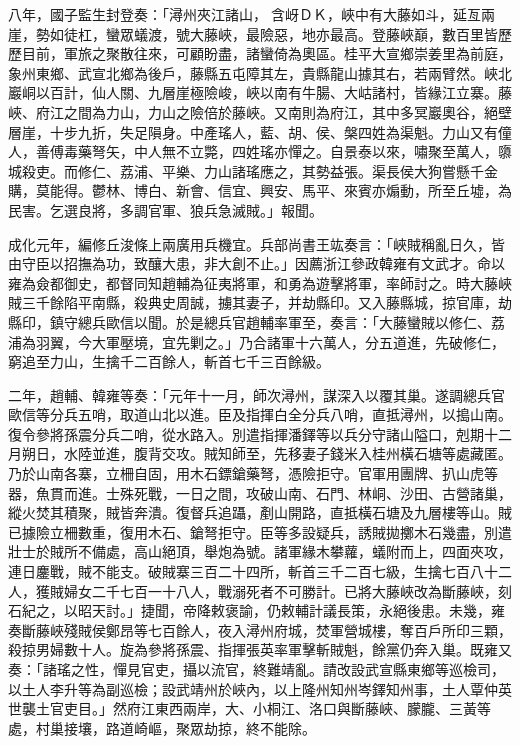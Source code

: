 \begin{pinyinscope}
八年，國子監生封登奏：「潯州夾江諸山，含岈ＤＫ，峽中有大藤如斗，延亙兩崖，勢如徒杠，蠻眾蟻渡，號大藤峽，最險惡，地亦最高。登藤峽巔，數百里皆歷歷目前，軍旅之聚散往來，可顧盼盡，諸蠻倚為奧區。桂平大宣鄉崇姜里為前庭，象州東鄉、武宣北鄉為後戶，藤縣五屯障其左，貴縣龍山據其右，若兩臂然。峽北巖峒以百計，仙人關、九層崖極險峻，峽以南有牛腸、大岵諸村，皆緣江立寨。藤峽、府江之間為力山，力山之險倍於藤峽。又南則為府江，其中多冥巖奧谷，絕壁層崖，十步九折，失足隕身。中產瑤人，藍、胡、侯、槃四姓為渠魁。力山又有僮人，善傅毒藥弩矢，中人無不立斃，四姓瑤亦憚之。自景泰以來，嘯聚至萬人，隳城殺吏。而修仁、荔浦、平樂、力山諸瑤應之，其勢益張。渠長侯大狗嘗懸千金購，莫能得。鬱林、博白、新會、信宜、興安、馬平、來賓亦煽動，所至丘墟，為民害。乞選良將，多調官軍、狼兵急滅賊。」報聞。

成化元年，編修丘浚條上兩廣用兵機宜。兵部尚書王竑奏言：「峽賊稱亂日久，皆由守臣以招撫為功，致釀大患，非大創不止。」因薦浙江參政韓雍有文武才。命以雍為僉都御史，都督同知趙輔為征夷將軍，和勇為遊擊將軍，率師討之。時大藤峽賊三千餘陷平南縣，殺典史周誠，擄其妻子，并劫縣印。又入藤縣城，掠官庫，劫縣印，鎮守總兵歐信以聞。於是總兵官趙輔率軍至，奏言：「大藤蠻賊以修仁、荔浦為羽翼，今大軍壓境，宜先剿之。」乃合諸軍十六萬人，分五道進，先破修仁，窮追至力山，生擒千二百餘人，斬首七千三百餘級。

二年，趙輔、韓雍等奏：「元年十一月，師次潯州，謀深入以覆其巢。遂調總兵官歐信等分兵五哨，取道山北以進。臣及指揮白全分兵八哨，直抵潯州，以搗山南。復令參將孫震分兵二哨，從水路入。別遣指揮潘鐸等以兵分守諸山隘口，剋期十二月朔日，水陸並進，腹背交攻。賊知師至，先移妻子錢米入桂州橫石塘等處藏匿。乃於山南各寨，立柵自固，用木石鏢鎗藥弩，憑險拒守。官軍用團牌、扒山虎等器，魚貫而進。士殊死戰，一日之間，攻破山南、石門、林峒、沙田、古營諸巢，縱火焚其積聚，賊皆奔潰。復督兵追躡，剷山開路，直抵橫石塘及九層樓等山。賊已據險立柵數重，復用木石、鎗弩拒守。臣等多設疑兵，誘賊拋擲木石幾盡，別遣壯士於賊所不備處，高山絕頂，舉炮為號。諸軍緣木攀蘿，蟻附而上，四面夾攻，連日鏖戰，賊不能支。破賊寨三百二十四所，斬首三千二百七級，生擒七百八十二人，獲賊婦女二千七百一十八人，戰溺死者不可勝計。已將大藤峽改為斷藤峽，刻石紀之，以昭天討。」捷聞，帝降敕褒諭，仍敕輔計議長策，永絕後患。未幾，雍奏斷藤峽殘賊侯鄭昂等七百餘人，夜入潯州府城，焚軍營城樓，奪百戶所印三顆，殺掠男婦數十人。旋為參將孫震、指揮張英率軍擊斬賊魁，餘黨仍奔入巢。既雍又奏：「諸瑤之性，憚見官吏，攝以流官，終難靖亂。請改設武宣縣東鄉等巡檢司，以土人李升等為副巡檢；設武靖州於峽內，以上隆州知州岑鐸知州事，土人覃仲英世襲土官吏目。」然府江東西兩岸，大、小桐江、洛口與斷藤峽、朦朧、三黃等處，村巢接壤，路道崎嶇，聚眾劫掠，終不能除。


\end{pinyinscope}
